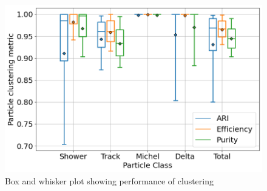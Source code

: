 \begin{figure}[H]
  \centering
  \includegraphics[width=120mm]{figures/clusteringPerformance.png}
  \caption{Box and whisker plot showing performance of clustering}
  \label{clusteringPerformance}
\end{figure}

